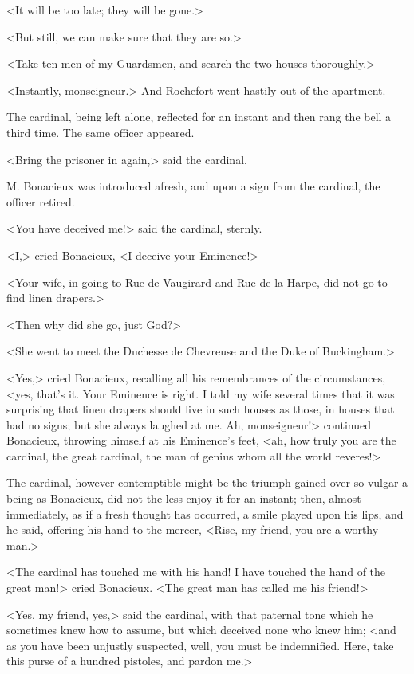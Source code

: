 <It will be too late; they will be gone.> 

<But still, we can make sure that they are so.> 

<Take ten men of my Guardsmen, and search the two houses thoroughly.> 

<Instantly, monseigneur.> And Rochefort went hastily out of the apartment. 

The cardinal, being left alone, reflected for an instant and then rang the bell a third time. The same officer appeared. 

<Bring the prisoner in again,> said the cardinal. 

M. Bonacieux was introduced afresh, and upon a sign from the cardinal, the officer retired. 

<You have deceived me!> said the cardinal, sternly. 

<I,> cried Bonacieux, <I deceive your Eminence!> 

<Your wife, in going to Rue de Vaugirard and Rue de la Harpe, did not go to find linen drapers.> 

<Then why did she go, just God?> 

<She went to meet the Duchesse de Chevreuse and the Duke of Buckingham.> 

<Yes,> cried Bonacieux, recalling all his remembrances of the circumstances, <yes, that's it. Your Eminence is right. I told my wife several times that it was surprising that linen drapers should live in such houses as those, in houses that had no signs; but she always laughed at me. Ah, monseigneur!> continued Bonacieux, throwing himself at his Eminence's feet, <ah, how truly you are the cardinal, the great cardinal, the man of genius whom all the world reveres!> 

The cardinal, however contemptible might be the triumph gained over so vulgar a being as Bonacieux, did not the less enjoy it for an instant; then, almost immediately, as if a fresh thought has occurred, a smile played upon his lips, and he said, offering his hand to the mercer, <Rise, my friend, you are a worthy man.> 

<The cardinal has touched me with his hand! I have touched the hand of the great man!> cried Bonacieux. <The great man has called me his friend!> 

<Yes, my friend, yes,> said the cardinal, with that paternal tone which he sometimes knew how to assume, but which deceived none who knew him; <and as you have been unjustly suspected, well, you must be indemnified. Here, take this purse of a hundred pistoles, and pardon me.> 

